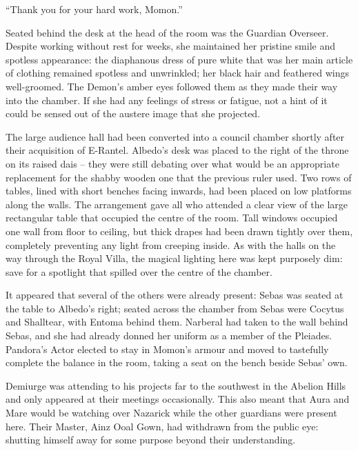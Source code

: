  

“Thank you for your hard work, Momon.”

 

Seated behind the desk at the head of the room was the Guardian Overseer. Despite working without rest for weeks, she maintained her pristine smile and spotless appearance: the diaphanous dress of pure white that was her main article of clothing remained spotless and unwrinkled; her black hair and feathered wings well-groomed. The Demon’s amber eyes followed them as they made their way into the chamber. If she had any feelings of stress or fatigue, not a hint of it could be sensed out of the austere image that she projected.

 

The large audience hall had been converted into a council chamber shortly after their acquisition of E-Rantel. Albedo’s desk was placed to the right of the throne on its raised dais – they were still debating over what would be an appropriate replacement for the shabby wooden one that the previous ruler used. Two rows of tables, lined with short benches facing inwards, had been placed on low platforms along the walls. The arrangement gave all who attended a clear view of the large rectangular table that occupied the centre of the room. Tall windows occupied one wall from floor to ceiling, but thick drapes had been drawn tightly over them, completely preventing any light from creeping inside. As with the halls on the way through the Royal Villa, the magical lighting here was kept purposely dim: save for a spotlight that spilled over the centre of the chamber.

 

It appeared that several of the others were already present: Sebas was seated at the table to Albedo's right; seated across the chamber from Sebas were Cocytus and Shalltear, with Entoma behind them. Narberal had taken to the wall behind Sebas, and she had already donned her uniform as a member of the Pleiades. Pandora’s Actor elected to stay in Momon’s armour and moved to tastefully complete the balance in the room, taking a seat on the bench beside Sebas’ own.

 

Demiurge was attending to his projects far to the southwest in the Abelion Hills and only appeared at their meetings occasionally. This also meant that Aura and Mare would be watching over Nazarick while the other guardians were present here. Their Master, Ainz Ooal Gown, had withdrawn from the public eye: shutting himself away for some purpose beyond their understanding.


